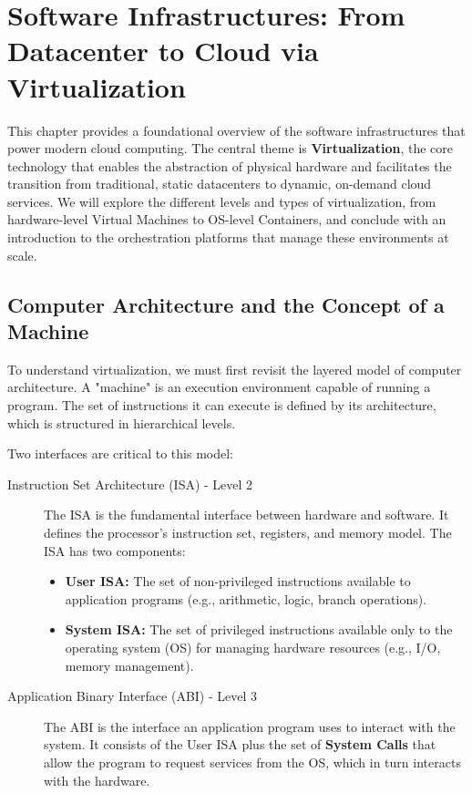 \chapter{Software Infrastructures: From Datacenter to Cloud via Virtualization}
\label{chap:sw_infra_virtualization}

This chapter provides a foundational overview of the software infrastructures that power modern cloud computing. The central theme is \textbf{Virtualization}, the core technology that enables the abstraction of physical hardware and facilitates the transition from traditional, static datacenters to dynamic, on-demand cloud services. We will explore the different levels and types of virtualization, from hardware-level Virtual Machines to OS-level Containers, and conclude with an introduction to the orchestration platforms that manage these environments at scale.

\section{Computer Architecture and the Concept of a Machine}

To understand virtualization, we must first revisit the layered model of computer architecture. A "machine" is an execution environment capable of running a program. The set of instructions it can execute is defined by its architecture, which is structured in hierarchical levels.


Two interfaces are critical to this model:
\begin{description}
    \item[Instruction Set Architecture (ISA) - Level 2] The ISA is the fundamental interface between hardware and software. It defines the processor's instruction set, registers, and memory model. The ISA has two components:
    \begin{itemize}
        \item \textbf{User ISA:} The set of non-privileged instructions available to application programs (e.g., arithmetic, logic, branch operations).
        \item \textbf{System ISA:} The set of privileged instructions available only to the operating system (OS) for managing hardware resources (e.g., I/O, memory management).
    \end{itemize}
    \item[Application Binary Interface (ABI) - Level 3] The ABI is the interface an application program uses to interact with the system. It consists of the User ISA plus the set of \textbf{System Calls} that allow the program to request services from the OS, which in turn interacts with the hardware.
\end{description}

